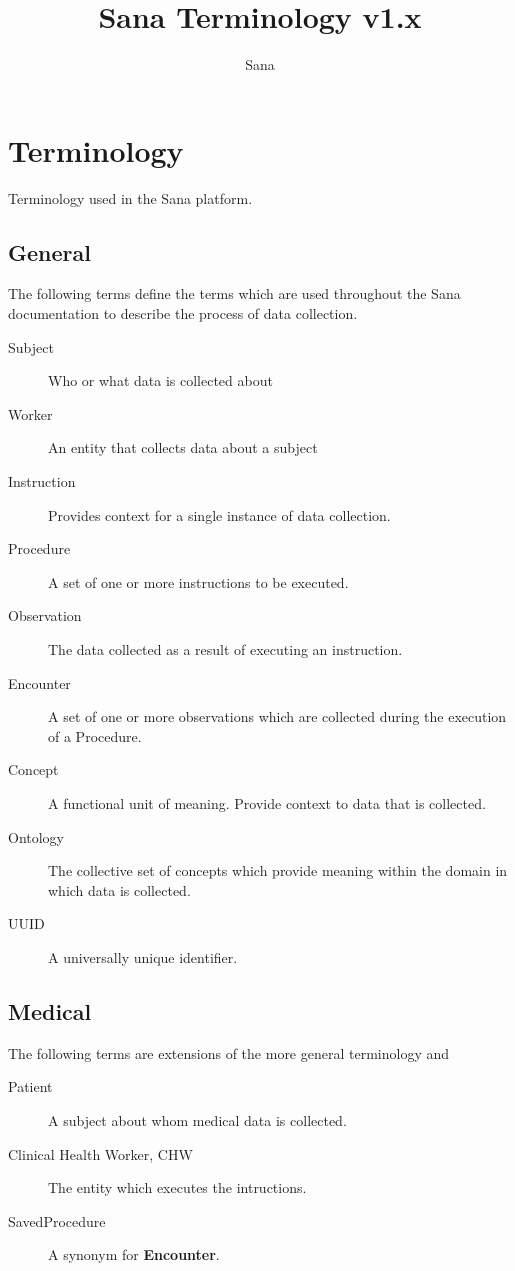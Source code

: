 \documentclass[a4paper,10pt]{article}
\title{Sana Terminology v1.x}
\author{Sana}
\begin{document}
\section{Terminology}
Terminology used in the Sana platform.  

\subsection{General}
The following terms define the terms which are used throughout the Sana 
documentation to describe the process of data collection.
\begin{description}
 \item[Subject] Who or what data is collected about 
 \item[Worker] An entity that collects data about a subject
 \item[Instruction] Provides context for a single instance of data collection. 
 \item[Procedure] A set of one or more instructions to be executed.
 \item[Observation] The data collected as a result of executing an instruction.
 \item[Encounter] A set of one or more observations which are collected during
 the execution of a Procedure.
 \item[Concept] A functional unit of meaning. Provide context to data that is
 collected.
 \item[Ontology] The collective set of concepts which provide meaning within
 the domain in which data is collected.
 \item[UUID] A universally unique identifier.
\end{description}

\subsection{Medical}
The following terms are extensions of the more general terminology and 
\begin{description}
 \item[Patient] A subject about whom medical data is collected.
 \item[Clinical Health Worker, CHW] The entity which executes the intructions.
 \item[SavedProcedure] A synonym for \textbf{Encounter}.
\end{description}
\end{document}
